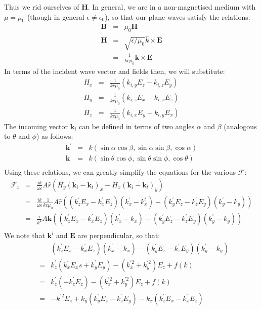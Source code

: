 \documentclass[a4article,12pt]{article}
\newcommand{\kvec}[0]{{\mathbf k}}
\newcommand{\Hvec}[0]{{\mathbf H}}
\newcommand{\Evec}[0]{{\mathbf E}}
\newcommand{\Fcal}[1]{{\mathcal F}_{#1}}
\begin{document}
Thus we rid ourselves of $\Hvec$. In general, we are in a non-magnetised medium with $\mu=\mu_0$ (though in general $\epsilon \ne \epsilon_0$), so that our plane waves satisfy the relations:
%
\begin{eqnarray}
{\mathbf B} & = & \mu_0 \Hvec \\
\mathbf{H} & = & \sqrt{\epsilon/\mu_0} \hat{k} \times \mathbf{E} \\
& = & \frac{1}{k c \mu_0} \kvec \times \mathbf{E} 
\end{eqnarray}
%
In terms of the incident wave vector and fields then, we will substitute:
%
\begin{eqnarray}
H_x & = & \frac{1}{k c \mu_0} \left( k_{i,y} E_z - k_{i,z} E_y \right) \\
H_y & = & \frac{1}{k c \mu_0} \left( k_{i,z} E_x - k_{i,x} E_z \right) \\
H_z & = & \frac{1}{k c \mu_0} \left( k_{i,x} E_y - k_{i,y} E_x \right)
\end{eqnarray}
%
The incoming vector $\kvec_i$ can be defined in terms of two angles $\alpha$ and $\beta$ (analogous to $\theta$ and $\phi$) as follows:
%
\begin{eqnarray}
\kvec^{\prime} & = & k \left( \sin \alpha \cos \beta, \sin \alpha \sin \beta, \cos \alpha \right) \\
\kvec & = & k \left( \sin \theta \cos \phi, \sin \theta \sin \phi, \cos \theta \right) \\
\end{eqnarray}
%
Using these relations, we can greatly simplify the equations for the various $\mathcal F$:
%
\begin{eqnarray}
\Fcal{1} & = & \frac{i k}{\omega \epsilon} A \hat{r} \left( H_y (\kvec_i - \kvec_t)_x - H_x (\kvec_i - \kvec_t)_y \right) \\
& = & \frac{i k}{\omega \epsilon} \frac{1}{k c \mu_0} A \hat{r} \left( ( k_z^{\prime} E_x - k_x^{\prime} E_z) (k_x^{\prime} - k_x^t) - (k_y^{\prime} E_z - k_z^{\prime} E_y) (k_y^{\prime} - k_y) \right) \\
& = & \frac{i}{k^2} A \kvec \left( ( k_z^{\prime} E_x - k_x^{\prime} E_z) (k_x^{\prime} - k_x) - (k_y^{\prime} E_z - k_z^{\prime} E_y) (k_y^{\prime} - k_y) \right) \\
\end{eqnarray}
%
We note that $\kvec^i$ and $\Evec$ are perpendicular, so that:
%
\begin{eqnarray}
&& ( k_z^{\prime} E_x - k_x^{\prime} E_z) (k_x^{\prime} - k_x) - (k_y^{\prime} E_z - k_z^{\prime} E_y) (k_y^{\prime} - k_y) \\
& = & k_z^{\prime} ( k_x^{\prime} E_xs + k_y^{\prime} E_y ) - ( k_x^{\prime 2} + k_y^{\prime 2}) E_z +f(k)\\
& = & k_z^{\prime} (-k_z^{\prime} E_z) - ( k_x^{\prime 2} + k_y^{\prime 2}) E_z +f(k) \\
& = & - k^{\prime 2} E_z  + k_y (k_y^{\prime} E_z - k_z^{\prime} E_y) - k_x ( k_z^{\prime} E_x - k_x^{\prime} E_z) 
\end{eqnarray}
\end{document}

